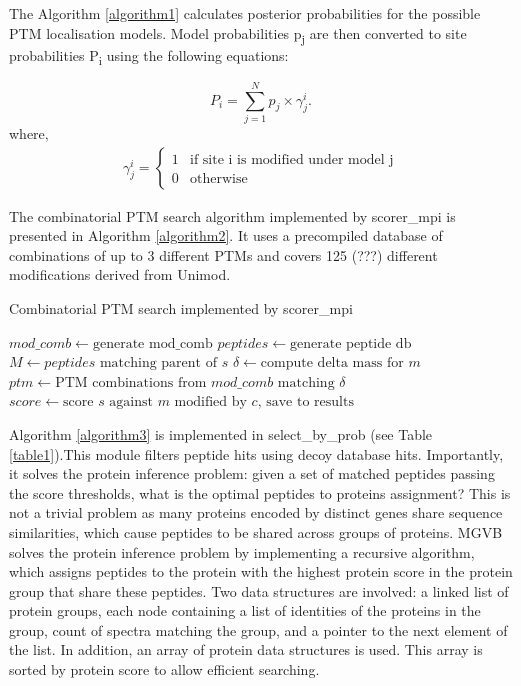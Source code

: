 \documentclass[sn-standardnature]{sn-jnl}%
\theoremstyle{thmstyleone}%
\theoremstyle{thmstyletwo}%
\theoremstyle{thmstylethree}%
\begin{document}
The Algorithm \ref{algorithm1} calculates posterior probabilities for the possible PTM localisation models. Model probabilities p\textsubscript{j} are then converted to site probabilities P\textsubscript{i} using the following equations:

\begin{equation}
{P_i} = \sum\limits_{j=1}^{N}{p}_j \times \gamma_j^i .\label{eq1}
\end{equation}
where,
\begin{align}
\gamma_j^i = 
\begin{cases}
  1 & \text{if site i is modified under model j} \\
  0 & \text{otherwise}
\end{cases}
\end{align}

The combinatorial PTM search algorithm implemented by scorer\_mpi is presented in Algorithm \ref{algorithm2}. It uses a precompiled database of combinations of up to 3 different PTMs and covers 125 (???) different modifications derived from Unimod.

\begin{algorithm}
\caption{Combinatorial PTM search implemented by scorer\_mpi}\label{algorithm2}
\begin{algorithmic}[1]
\State $mod\_comb \gets \text {generate mod\_comb}$ 
\State $peptides \gets \text {generate peptide db}$ 
    
       \State $M \gets \text {$peptides$ matching parent of $s$}$    
           \State $\delta \gets \text {compute delta mass for $m$}$          
           \State $ptm \gets \text {PTM combinations from $mod\_comb$ matching } \delta$
               \State $score \gets \text {score $s$ against $m$ modified by $c$, save to results}$
            \EndFor            
        \EndFor
\EndFor
\end{algorithmic}
\end{algorithm}
\bigskip

Algorithm \ref{algorithm3} is implemented in select\_by\_prob (see Table \ref {table1}).This module filters peptide hits using decoy database hits. Importantly, it solves the protein inference problem: given a set of matched peptides passing the score thresholds, what is the optimal peptides to proteins assignment? This is not a trivial problem as many proteins encoded by distinct genes share sequence similarities, which cause peptides to be shared across groups of proteins. MGVB solves the protein inference problem by implementing a recursive algorithm, which assigns peptides to the protein with the highest protein score in the protein group that share these peptides. Two data structures are involved: a linked list of protein groups, each node containing a list of identities of the proteins in the group,  count of spectra matching the group, and a pointer to the next element of the list. In addition, an array of protein data structures is used. This array is sorted by protein score to allow efficient searching.
\end{document}
